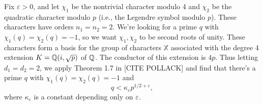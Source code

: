 Fix $\varepsilon>0$, and let $\chi_1$ be the nontrivial character modulo 4 and $\chi_2$ be the quadratic character modulo $p$ (i.e., the Legendre symbol modulo $p$). These characters have orders $n_1=n_2=2$. We're looking for a prime $q$ with $\chi_1(q)=\chi_2(q)=-1$, so we want $\chi_1,\chi_2$ to be second roots of unity. These characters form a basis for the group of characters $\mathbb{X}$ associated with the degree 4 extension $K=\mathbb{Q}(i, \sqrt{p})$ of $\mathbb{Q}$. The conductor of this extension is $4p$. Thus letting $d_1=d_2=2$, we apply Theorem 1.7 in [CITE POLLACK] and find that there's a prime $q$ with $\chi_1(q)=\chi_2(q)=-1$ and
\[
q < \kappa_{\varepsilon}p^{1/2 + \varepsilon},
\]
where $\kappa_\varepsilon$ is a constant depending only on $\varepsilon$. 